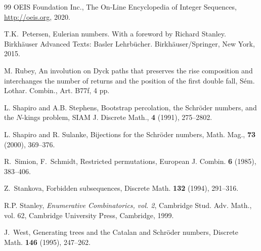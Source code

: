 \documentclass[12pt]{amsart}
\numberwithin{equation}{section}
\theoremstyle{plain}
\theoremstyle{definition}
\begin{document}
\begin{thebibliography}{99}
 OEIS Foundation Inc., The On-Line Encyclopedia of Integer Sequences,  \href{http://oeis.org}{http://oeis.org}, 2020.

 T.K.~Petersen, Eulerian numbers. With a foreword by Richard Stanley. Birkh\"auser Advanced Texts: Basler Lehrb\"ucher. Birkh\"auser/Springer, New York, 2015.

M. Rubey, An involution on Dyck paths that preserves the rise composition and interchanges the number of returns and the position of the first double fall, S\'em. Lothar. Combin., Art. B77f, 4 pp.

 L. Shapiro and A.B. Stephens, Bootstrap percolation, the Schr\"oder numbers, and the $N$-kings problem, SIAM J. Discrete Math., {\bf4} (1991), 275--2802.

 L. Shapiro and R. Sulanke, Bijections for the Schr\"oder numbers, Math. Mag., {\bf73} (2000), 369--376. 

 R.~Simion, F.~Schmidt, Restricted permutations, European J. Combin. {\bf6} (1985), 383--406.


 Z.~Stankova, Forbidden subsequences, Discrete Math. {\bf132} (1994), 291--316.


 R.P. Stanley, {\em Enumerative Combinatorics, vol. 2}, Cambridge Stud. Adv. Math., vol. 62, Cambridge University Press, Cambridge, 1999.








 J.~West, Generating trees and the Catalan and Schr\"oder numbers, Discrete Math. {\bf146} (1995), 247--262.

\end{thebibliography}
\end{document}
